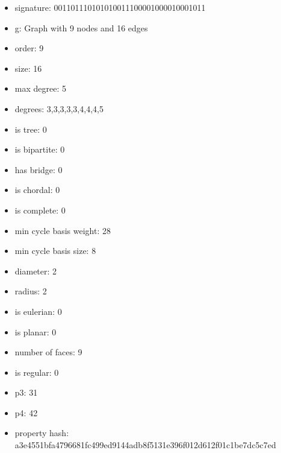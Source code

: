 \newpage
\begin{figure}
\end{figure}
\begin{itemize}
\item signature: 001101110101010011100001000010001011
\item g: Graph with 9 nodes and 16 edges
\item order: 9
\item size: 16
\item max degree: 5
\item degrees: 3,3,3,3,3,4,4,4,5
\item is tree: 0
\item is bipartite: 0
\item has bridge: 0
\item is chordal: 0
\item is complete: 0
\item min cycle basis weight: 28
\item min cycle basis size: 8
\item diameter: 2
\item radius: 2
\item is eulerian: 0
\item is planar: 0
\item number of faces: 9
\item is regular: 0
\item p3: 31
\item p4: 42
\item property hash: a3e4551bfa4796681fc499ed9144adb8f5131e396f012d612f01c1be7dc5c7ed
\end{itemize}
